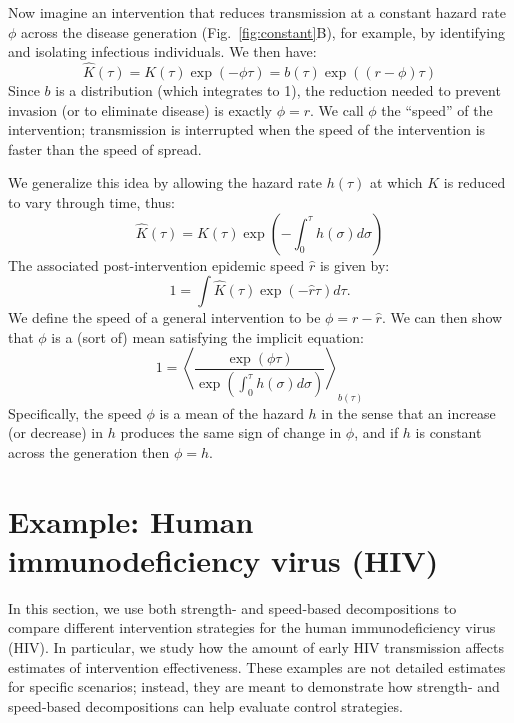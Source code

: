 \documentclass[12pt]{article}
\newcommand{\figref}[1]{Fig.~\ref{fig:#1}}
\newcommand{\eqlab}[1]{\label{eq:#1}}
\begin{document}
Now imagine an intervention that reduces transmission at a constant hazard rate $\phi$ across the disease generation (\figref{constant}B), for example, by identifying and isolating infectious individuals.
We then have:
\begin{equation}
	\hat K(\tau) = K(\tau)\exp(-\phi\tau) = b(\tau)\exp((r-\phi)\tau)
\end{equation}
Since $b$ is a distribution (which integrates to 1), the reduction needed to prevent invasion (or to eliminate disease)  is exactly $\phi=r$. 
We call $\phi$ the ``speed'' of the intervention; transmission is interrupted when the speed of the intervention is faster than the speed of spread.

We generalize this idea by allowing the hazard rate $h(\tau)$ at which $K$ is reduced to vary through time, thus:
\begin{equation}
	\hat K(\tau) = K(\tau) \exp\left(-\int_0^\tau h(\sigma) d\sigma\right)
\end{equation}
The associated post-intervention epidemic speed $\hat r$ is given by:
\begin{equation}
	1 = \int \hat K(\tau) \exp(-\hat r\tau) d\tau.	
\end{equation}
We define the speed of a general intervention to be $\phi = r - \hat r$. 
We can then show that $\phi$ is a (sort of) mean satisfying the implicit equation:
\begin{equation}
	1 = \left\langle \frac{\exp(\phi \tau) }{\exp\left(\int_0^\tau h(\sigma) d\sigma\right)} \right\rangle_{b(\tau)}
	\eqlab{speedMean}
\end{equation}
Specifically, the speed $\phi$ is a mean of the hazard $h$ in the sense that an increase (or decrease) in $h$ produces the same sign of change in $\phi$, and if $h$ is constant across the generation then $\phi=h$.

\section{Example: Human immunodeficiency virus (HIV)}

In this section, we use both strength- and speed-based decompositions to compare different intervention strategies for the human immunodeficiency virus (HIV). 
In particular, we study how the amount of early HIV transmission affects estimates of intervention effectiveness. 
These examples are not detailed estimates for specific scenarios; 
instead, they are meant to demonstrate how strength- and speed-based decompositions can help evaluate control strategies.
\end{document}
